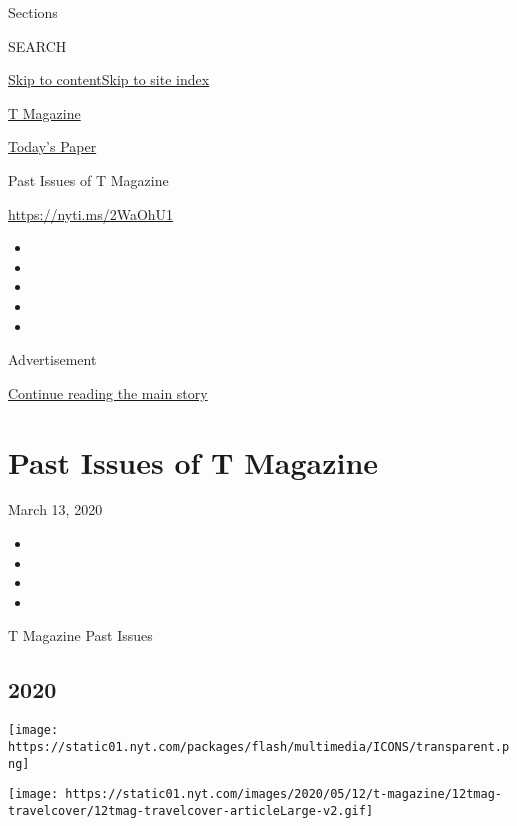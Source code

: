 Sections

SEARCH

\protect\hyperlink{site-content}{Skip to
content}\protect\hyperlink{site-index}{Skip to site index}

\href{https://www.nytimes.com/section/t-magazine}{T Magazine}

\href{https://myaccount.nytimes.com/auth/login?response_type=cookie\&client_id=vi}{}

\href{https://www.nytimes.com/section/todayspaper}{Today's Paper}

Past Issues of T Magazine

\url{https://nyti.ms/2WaOhU1}

\begin{itemize}
\item
\item
\item
\item
\item
\end{itemize}

Advertisement

\protect\hyperlink{after-top}{Continue reading the main story}

\hypertarget{past-issues-of-t-magazine}{%
\section{Past Issues of T Magazine}\label{past-issues-of-t-magazine}}

March 13, 2020

\begin{itemize}
\item
\item
\item
\item
\end{itemize}

T Magazine Past Issues

\hypertarget{2020}{%
\subsection{2020}\label{2020}}

\href{https://www.nytimes.com/issue/t-magazine/2020/05/02/ts-may-17-travel-issue}{}

\texttt{[image: https://static01.nyt.com/packages/flash/multimedia/ICONS/transparent.png]}

\texttt{[image: https://static01.nyt.com/images/2020/05/12/t-magazine/12tmag-travelcover/12tmag-travelcover-articleLarge-v2.gif]}

